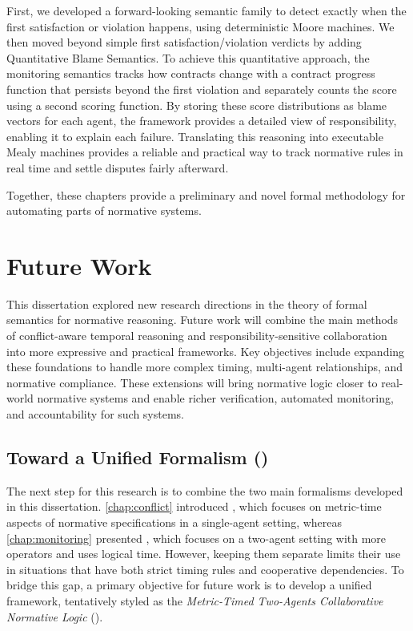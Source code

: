 First, we developed a forward-looking semantic family to detect exactly when the first satisfaction or violation happens, using deterministic Moore machines. We then moved beyond simple first satisfaction/violation verdicts by adding Quantitative Blame Semantics. To achieve this quantitative approach, the monitoring semantics tracks how contracts change with a contract progress function that persists beyond the first violation and separately counts the score using a second scoring function. By storing these score distributions as blame vectors for each agent, the framework provides a detailed view of responsibility, enabling it to explain each failure. Translating this reasoning into executable Mealy machines provides a reliable and practical way to track normative rules in real time and settle disputes fairly afterward.

Together, these chapters provide a preliminary and novel formal methodology for automating parts of normative systems.

\section{Future Work}
This dissertation explored new research directions in the theory of formal semantics for normative reasoning. Future work will combine the main methods of conflict-aware temporal reasoning and responsibility-sensitive collaboration into more expressive and practical frameworks. Key objectives include expanding these foundations to handle more complex timing, multi-agent relationships, and normative compliance. These extensions will bring normative logic closer to real-world normative systems and enable richer verification, automated monitoring, and accountability for such systems.

\subsection{Toward a Unified Formalism ()}
The next step for this research is to combine the two main formalisms developed in this dissertation. \ref{chap:conflict} introduced \TDDLfm, which focuses on metric-time aspects of normative specifications in a single-agent setting, whereas \ref{chap:monitoring} presented \cDL, which focuses on a two-agent setting with more operators and uses logical time. However, keeping them separate limits their use in situations that have both strict timing rules and cooperative dependencies. To bridge this gap, a primary objective for future work is to develop a unified framework, tentatively styled as the \emph{Metric-Timed Two-Agents Collaborative Normative Logic} ().

